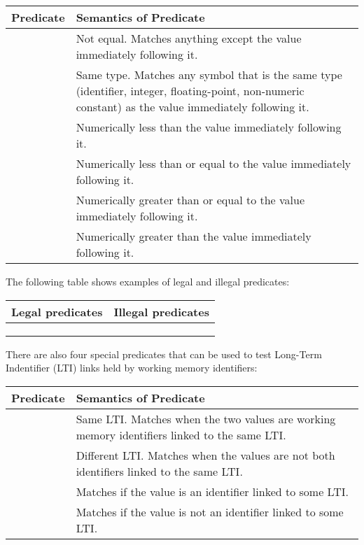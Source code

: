 \begin{tabularx}{\textwidth}{| l | X |}
	\hline
	\bf{Predicate} &  \bf{Semantics of Predicate} \\
	\hline
	\soar{<>}  & Not equal. Matches anything except the value immediately following it. \\
	\soar{<=>} & Same type.  Matches any symbol that is the same type (identifier,
	             integer, floating-point, non-numeric constant) as the value
	             immediately following it. \\
	\soar{<}   & Numerically less than the value immediately following it. \\
	\soar{<=}  & Numerically less than or equal to the value immediately
	             following it. \\
	\soar{>=}  & Numerically greater than or equal to the value immediately
	             following it. \\
	\soar{>}   & Numerically greater than the value immediately following it. \\
	\hline
\end{tabularx}
\vspace{10pt}


The following table shows examples of legal and illegal predicates:

\begin{tabular}{| l | l |}
	\hline
	\bf{Legal predicates} &  \bf{Illegal predicates} \\
	\hline
	\soar{> <valuex>} & \soar{> > <valuey>} \\
	\soar{< 1}  & \soar{1 >} \\
	\soar{<=> <y>} & \soar{= 10} \\  \hline
\end{tabular} \vspace{10pt}

There are also four special predicates that can be used to test Long-Term Indentifier (LTI) links held by working memory identifiers: 

\begin{tabularx}{\textwidth}{| l | X |}
	\hline
	\bf{Predicate} &  \bf{Semantics of Predicate} \\
	\hline
	\soar{@}  & Same LTI. Matches when the two values are working memory identifiers linked to the same LTI. \\
	\soar{!@} & Different LTI.  Matches when the values are not both identifiers linked to the same LTI. \\
	\soar{@+} & Matches if the value is an identifier linked to some LTI. \\
	\soar{@-} & Matches if the value is not an identifier linked to some LTI. \\
	\hline
\end{tabularx}
\vspace{10pt}

